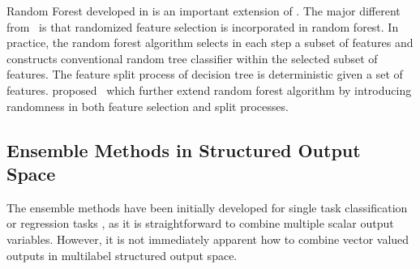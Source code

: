 {Random Forest developed in \citep{Breiman01random} is an important extension of \bagging.
The major different from \bagging\ is that randomized feature selection is incorporated in random forest.
In practice, the random forest algorithm selects in each step a subset of features and constructs conventional random tree classifier within the selected subset of features.
The feature split process of decision tree is deterministic given a set of features.
\citet{Liu08spectrum} proposed \vrtree\ which further extend random forest algorithm by introducing randomness in both feature selection and split processes.


\subsection{Ensemble Methods in Structured Output Space}

The ensemble methods have been initially developed for single task classification \citep{Breiman96bagging,Freund97a} or regression tasks \citep{Breiman96bagging}, as it is straightforward to combine multiple scalar output variables.
However, it is not immediately apparent how to combine vector valued outputs in multilabel structured output space.

}
